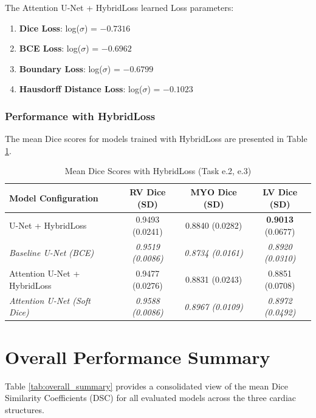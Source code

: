 \documentclass{article}
\begin{document}
The Attention U-Net + HybridLoss learned Loss parameters:
\begin{enumerate}
  \item \textbf{Dice Loss}: log($\sigma$) = $-0.7316$
  \item \textbf{BCE Loss}: log($\sigma$) = $-0.6962$
  \item \textbf{Boundary Loss}: log($\sigma$) = $-0.6799$
  \item \textbf{Hausdorff Distance Loss}: log($\sigma$) = $-0.1023$
\end{enumerate}
\subsubsection{Performance with HybridLoss}

The mean Dice scores for models trained with HybridLoss are presented in Table \ref{tab:hybridloss_results}.
\begin{table}[H]
  \centering
  \caption{Mean Dice Scores with HybridLoss (Task e.2, e.3)}
  \label{tab:hybridloss_results}
  \begin{tabular}{l|c|c|c}
    \toprule
    Model Configuration                  & RV Dice (SD)             & MYO Dice (SD)            & LV Dice (SD)             \\
    \midrule
    U-Net + HybridLoss                   & 0.9493 (0.0241)          & 0.8840 (0.0282)          & \textbf{0.9013} (0.0677) \\
    \textit{Baseline U-Net (BCE)}        & \textit{0.9519 (0.0086)} & \textit{0.8734 (0.0161)} & \textit{0.8920 (0.0310)} \\
    \midrule
    Attention U-Net + HybridLoss         & 0.9477 (0.0276)          & 0.8831 (0.0243)          & 0.8851 (0.0708)          \\
    \textit{Attention U-Net (Soft Dice)} & \textit{0.9588 (0.0086)} & \textit{0.8967 (0.0109)} & \textit{0.8972 (0.0492)} \\
    \bottomrule
  \end{tabular}
\end{table}


\section{Overall Performance Summary}
Table \ref{tab:overall_summary} provides a consolidated view of the mean Dice Similarity Coefficients (DSC) for all evaluated models across the three cardiac structures.
\end{document}
